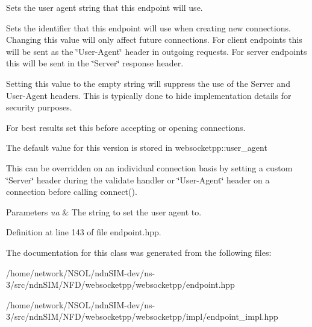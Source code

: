 Sets the user agent string that this endpoint will use. 

Sets the identifier that this endpoint will use when creating new connections. Changing this value will only affect future connections. For client endpoints this will be sent as the \char`\"{}\+User-\/\+Agent\char`\"{} header in outgoing requests. For server endpoints this will be sent in the \char`\"{}\+Server\char`\"{} response header.

Setting this value to the empty string will suppress the use of the Server and User-\/\+Agent headers. This is typically done to hide implementation details for security purposes.

For best results set this before accepting or opening connections.

The default value for this version is stored in websocketpp\+::user\+\_\+agent

This can be overridden on an individual connection basis by setting a custom \char`\"{}\+Server\char`\"{} header during the validate handler or \char`\"{}\+User-\/\+Agent\char`\"{} header on a connection before calling connect().


\begin{DoxyParams}{Parameters}
{\em ua} & The string to set the user agent to. \\
\hline
\end{DoxyParams}


Definition at line 143 of file endpoint.\+hpp.



The documentation for this class was generated from the following files\+:\begin{DoxyCompactItemize}
\item 
/home/network/\+N\+S\+O\+L/ndn\+S\+I\+M-\/dev/ns-\/3/src/ndn\+S\+I\+M/\+N\+F\+D/websocketpp/websocketpp/endpoint.\+hpp\item 
/home/network/\+N\+S\+O\+L/ndn\+S\+I\+M-\/dev/ns-\/3/src/ndn\+S\+I\+M/\+N\+F\+D/websocketpp/websocketpp/impl/endpoint\+\_\+impl.\+hpp\end{DoxyCompactItemize}
